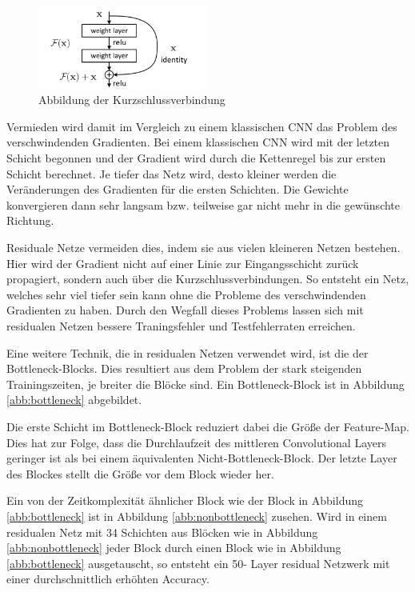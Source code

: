 \begin{figure}[h]
 \centering
 \includegraphics[width=0.5\textwidth]{KapitelPartA/images/kurzschluss.png}
 \caption{Abbildung der Kurzschlussverbindung \cite{resnet}}
 \label{abb:residual}
\end{figure}



Vermieden wird damit im Vergleich zu einem klassischen CNN das Problem des verschwindenden Gradienten. Bei einem klassischen CNN wird mit der letzten Schicht begonnen und der Gradient wird durch die Kettenregel bis zur ersten Schicht berechnet. Je tiefer das Netz wird, desto kleiner werden die Veränderungen des Gradienten für die ersten Schichten. Die Gewichte konvergieren dann sehr langsam bzw. teilweise gar nicht mehr in die gewünschte Richtung.


Residuale Netze vermeiden dies, indem sie aus vielen kleineren Netzen bestehen. Hier wird der Gradient nicht auf einer Linie zur Eingangsschicht zurück propagiert, sondern auch über die Kurzschlussverbindungen. So entsteht ein Netz, welches sehr viel tiefer sein kann ohne die Probleme des verschwindenden Gradienten zu haben. Durch den Wegfall dieses Problems lassen sich mit residualen Netzen bessere Traningsfehler und Testfehlerraten erreichen.

Eine weitere Technik, die in residualen Netzen verwendet wird, ist die der Bottleneck-Blocks. Dies resultiert aus dem Problem der stark steigenden Trainingszeiten, je breiter die Blöcke sind. Ein Bottleneck-Block ist in Abbildung \ref{abb:bottleneck} abgebildet.

Die erste Schicht im Bottleneck-Block reduziert dabei die Größe der Feature-Map. Dies hat zur Folge, dass die Durchlaufzeit des mittleren Convolutional Layers geringer ist als bei einem äquivalenten Nicht-Bottleneck-Block. Der letzte Layer des Blockes stellt die Größe vor dem Block wieder her.

Ein von der Zeitkomplexität ähnlicher Block wie der Block in Abbildung \ref{abb:bottleneck} ist in Abbildung \ref{abb:nonbottleneck} zusehen. Wird in einem residualen Netz mit 34 Schichten  aus Blöcken wie in Abbildung \ref{abb:nonbottleneck} jeder Block durch einen Block wie in Abbildung \ref{abb:bottleneck} ausgetauscht, so entsteht ein 50- Layer residual Netzwerk mit einer durchschnittlich erhöhten Accuracy.


